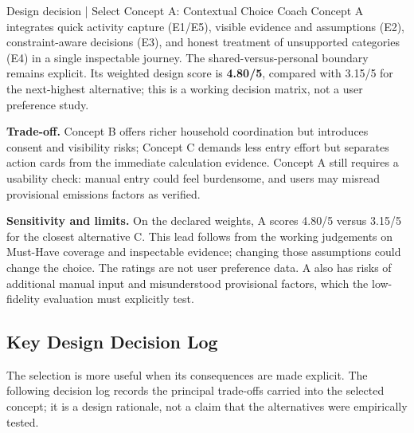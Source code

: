 \documentclass[12pt,a4paper]{article}
\begin{document}
\begin{insightbox}{Design decision | Select Concept A: Contextual Choice Coach}
Concept A integrates quick activity capture (E1/E5), visible evidence and assumptions (E2), constraint-aware decisions (E3), and honest treatment of unsupported categories (E4) in a single inspectable journey. The shared-versus-personal boundary remains explicit. Its weighted design score is \textbf{4.80/5}, compared with 3.15/5 for the next-highest alternative; this is a working decision matrix, not a user preference study.
\end{insightbox}

\textbf{Trade-off.} Concept B offers richer household coordination but introduces consent and visibility risks; Concept C demands less entry effort but separates action cards from the immediate calculation evidence. Concept A still requires a usability check: manual entry could feel burdensome, and users may misread provisional emissions factors as verified.

\textbf{Sensitivity and limits.} On the declared weights, A scores 4.80/5 versus 3.15/5 for the closest alternative C. This lead follows from the working judgements on Must-Have coverage and inspectable evidence; changing those assumptions could change the choice. The ratings are not user preference data. A also has risks of additional manual input and misunderstood provisional factors, which the low-fidelity evaluation must explicitly test.

\subsection{Key Design Decision Log}
The selection is more useful when its consequences are made explicit. The following decision log records the principal trade-offs carried into the selected concept; it is a design rationale, not a claim that the alternatives were empirically tested.
\end{document}
